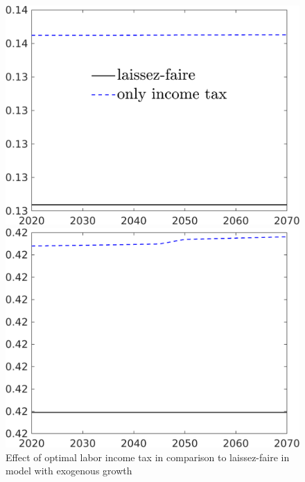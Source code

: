 \begin{figure}[h!!]
	\centering
	\caption{Effect of optimal labor income tax in comparison to laissez-faire in model with exogenous growth }\label{fig:LF_vs_onlytaul_xgr}
	\begin{minipage}[]{0.32\textwidth}
		\includegraphics[width=1\textwidth]{../../codding_model/own_basedOnFried/optimalPol_190722_tidiedUp/figures/all_10Aout22/CountTaul_modxgr_target_GFF_spillover0_sep1_extern0_PV1_etaa0.79_lgd1.png}
	\end{minipage}
	\begin{minipage}[]{0.32\textwidth}
		\includegraphics[width=1\textwidth]{../../codding_model/own_basedOnFried/optimalPol_190722_tidiedUp/figures/all_10Aout22/CountTaul_modxgr_target_EY_spillover0_sep1_extern0_PV1_etaa0.79_lgd0.png}

\end{minipage}
\end{figure}
